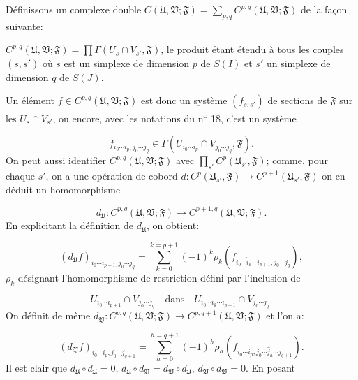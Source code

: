 Définissons un complexe double $C(\mathfrak{U}, \mathfrak{V}; \mathfrak{F}) = \sum_{p,q} C^{p,q}(\mathfrak{U}, \mathfrak{V}; \mathfrak{F})$ de la façon suivante:

$C^{p,q}(\mathfrak{U}, \mathfrak{V}; \mathfrak{F}) = \prod \Gamma (U_s \cap V_{s'}, \mathfrak{F})$, le produit étant étendu à tous les couples $(s, s')$ où $s$ est un simplexe de dimension $p$ de $S(I)$ et $s'$ un simplexe de dimension $q$ de $S(J)$.

Un élément $f \in C^{p,q}(\mathfrak{U}, \mathfrak{V}; \mathfrak{F})$ est donc un système $(f_{s,s'})$ de sections de $\mathfrak{F}$ sur les $U_s \cap V_{s'}$, ou encore, avec les notations du n\textsuperscript{o} 18, c'est un système

\begin{equation*}
f_{i_0 \cdots i_p, j_0 \cdots j_q} \in \Gamma(U_{i_0 \cdots i_p} \cap V_{j_0 \cdots j_q}, \mathfrak{F}).
\end{equation*}
On peut aussi identifier $C^{p,q}(\mathfrak{U}, \mathfrak{V}; \mathfrak{F})$ avec $\prod_{s'} C^p(\mathfrak{U}_{s'}, \mathfrak{F})$; comme, pour chaque $s'$, on a une opération de cobord $d:C^p(\mathfrak{U}_{s'}, \mathfrak{F}) \to C^{p+1}(\mathfrak{U}_{s'}, \mathfrak{F})$ on en déduit un homomorphisme

\begin{equation*}
d_{\mathfrak{U}} : C^{p,q}(\mathfrak{U}, \mathfrak{V}; \mathfrak{F}) \to C^{p+1,q}(\mathfrak{U}, \mathfrak{V}; \mathfrak{F}).
\end{equation*}
En explicitant la définition de $d_{\mathfrak{U}}$, on obtient:

\begin{equation*}
(d_{\mathfrak{U}}f)_{i_0 \cdots i_{p+1}, j_0 \cdots j_q} = \sum_{k=0}^{k=p+1} (-1)^k \rho_k(f_{i_0 \cdots \hat{i}_k \cdots i_{p+1}, j_0 \cdots j_q}),
\end{equation*}
$\rho_k$ désignant l'homomorphisme de restriction défini par l'inclusion de

\begin{equation*}
U_{i_0 \cdots i_{p+1}} \cap V_{j_0 \cdots j_q} \quad \text{dans} \quad U_{i_0 \cdots i_k \cdots i_{p+1}} \cap V_{j_0 \cdots j_q}.
\end{equation*}
On définit de même $d_{\mathfrak{V}}:C^{p,q}(\mathfrak{U}, \mathfrak{V}; \mathfrak{F}) \to C^{p,q+1}(\mathfrak{U}, \mathfrak{V}; \mathfrak{F})$ et l'on a:

\begin{equation*}
(d_{\mathfrak{V}}f)_{i_0 \cdots i_p, j_0 \cdots j_{q+1}} = \sum_{h=0}^{h=q+1} (-1)^h \rho_h(f_{i_0 \cdots i_p, j_0 \cdots \hat{j}_h \cdots j_{q+1}}).
\end{equation*}
Il est clair que $d_{\mathfrak{U}} \circ d_{\mathfrak{U}} = 0$, $d_{\mathfrak{U}} \circ d_{\mathfrak{V}} = d_{\mathfrak{V}} \circ d_{\mathfrak{U}}$, $d_{\mathfrak{V}} \circ d_{\mathfrak{V}} = 0$. En posant


